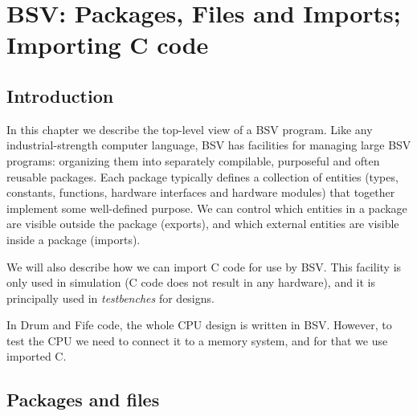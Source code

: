 

\chapter{BSV: Packages, Files and Imports; Importing C code}


\setcounter{page}{1}
\renewcommand{\thepage}{\arabic{chapter}-\arabic{page}}

\label{ch_Packages}


\section{Introduction}

In this chapter we describe the top-level view of a BSV program.  Like
any industrial-strength computer language, BSV has facilities for
managing large BSV programs: organizing them into separately
compilable, purposeful and often reusable packages.  Each package
typically defines a collection of entities (types, constants,
functions, hardware interfaces and hardware modules) that together
implement some well-defined purpose.  We can control which entities in
a package are visible outside the package (exports), and which
external entities are visible inside a package (imports).

We will also describe how we can import C code for use by BSV.  This
facility is only used in simulation (C code does not result in any
hardware), and it is principally used in \emph{testbenches} for
designs.

In Drum and Fife code, the whole CPU design is written in BSV.
However, to test the CPU we need to connect it to a memory system, and
for that we use imported C.


\section{Packages and files}


